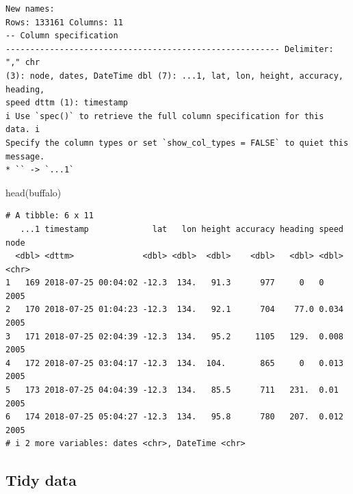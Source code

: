 \documentclass[
  letterpaper,
  DIV=11,
  numbers=noendperiod]{scrartcl}
\newenvironment{Shaded}{\begin{snugshade}}{\end{snugshade}}
\newcommand{\FunctionTok}[1]{\textcolor[rgb]{0.28,0.35,0.67}{#1}}
\newcommand{\NormalTok}[1]{\textcolor[rgb]{0.00,0.23,0.31}{#1}}
\begin{document}
\begin{verbatim}
New names:
Rows: 133161 Columns: 11
-- Column specification
-------------------------------------------------------- Delimiter: "," chr
(3): node, dates, DateTime dbl (7): ...1, lat, lon, height, accuracy, heading,
speed dttm (1): timestamp
i Use `spec()` to retrieve the full column specification for this data. i
Specify the column types or set `show_col_types = FALSE` to quiet this message.
* `` -> `...1`
\end{verbatim}

\begin{Shaded}
\begin{Highlighting}[]
\FunctionTok{head}\NormalTok{(buffalo)}
\end{Highlighting}
\end{Shaded}

\begin{verbatim}
# A tibble: 6 x 11
   ...1 timestamp             lat   lon height accuracy heading speed node 
  <dbl> <dttm>              <dbl> <dbl>  <dbl>    <dbl>   <dbl> <dbl> <chr>
1   169 2018-07-25 00:04:02 -12.3  134.   91.3      977     0   0     2005 
2   170 2018-07-25 01:04:23 -12.3  134.   92.1      704    77.0 0.034 2005 
3   171 2018-07-25 02:04:39 -12.3  134.   95.2     1105   129.  0.008 2005 
4   172 2018-07-25 03:04:17 -12.3  134.  104.       865     0   0.013 2005 
5   173 2018-07-25 04:04:39 -12.3  134.   85.5      711   231.  0.01  2005 
6   174 2018-07-25 05:04:27 -12.3  134.   95.8      780   207.  0.012 2005 
# i 2 more variables: dates <chr>, DateTime <chr>
\end{verbatim}

\subsection{Tidy data}\label{tidy-data}
\end{document}
